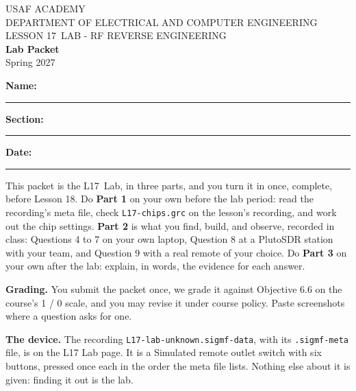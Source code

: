 \documentclass{exam}
\def\labLesson{17}
\def\thisterm{\thisTermIn}
\def\thisterm{Spring 2027}
\begin{document}
\pagestyle{headandfoot}   %


\begin{center}
USAF ACADEMY \\
DEPARTMENT OF ELECTRICAL AND COMPUTER ENGINEERING \\
LESSON \labLesson\ LAB - RF REVERSE ENGINEERING \\
\textbf{Lab Packet} \\
\thisterm \\[4mm]
\end{center}

\vspace{-4pt}
\textbf{Name:} \rule[-2pt]{2.6in}{0.4pt} \hfill
\textbf{Section:} \rule[-2pt]{0.9in}{0.4pt} \hfill
\textbf{Date:} \rule[-2pt]{1.1in}{0.4pt}

\vspace{4pt}


\vspace{2pt}

This packet is the L\labLesson\ Lab, in three parts, and you turn it in once, complete,
before Lesson 18. Do \textbf{Part 1} on your own before the lab period: read the
recording's meta file, check \texttt{L17-chips.grc} on the lesson's recording, and work out the chip settings.
\textbf{Part 2} is what you find, build, and observe, recorded in class: Questions 4 to
7 on your own laptop, Question 8 at a PlutoSDR station with your team, and Question 9
with a real remote of your choice. Do
\textbf{Part 3} on your own after the lab: explain, in words, the evidence for each
answer.

\textbf{Grading.} You submit the packet once, we grade it against Objective 6.6 on
the course's 1 / 0 scale, and you may revise it under course policy. Paste screenshots
where a question asks for one.

\textbf{The device.} The recording \texttt{L17-lab-unknown.sigmf-data}, with its
\texttt{.sigmf-meta} file, is on the L17 Lab page. It is a Simulated remote outlet
switch with six buttons, pressed once each in the order the meta file lists. Nothing
else about it is given: finding it out is the lab.
\end{document}
